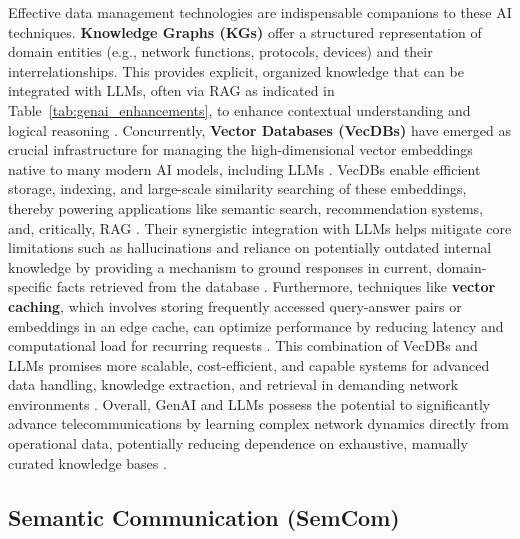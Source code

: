 \documentclass[sigconf]{acmart}
\begin{document}
Effective data management technologies are indispensable companions to these AI techniques. \textbf{Knowledge Graphs (KGs)} offer a structured representation of domain entities (e.g., network functions, protocols, devices) and their interrelationships. This provides explicit, organized knowledge that can be integrated with LLMs, often via RAG as indicated in Table~\ref{tab:genai_enhancements}, to enhance contextual understanding and logical reasoning \cite{ref4}. Concurrently, \textbf{Vector Databases (VecDBs)} have emerged as crucial infrastructure for managing the high-dimensional vector embeddings native to many modern AI models, including LLMs \cite{ref8}. VecDBs enable efficient storage, indexing, and large-scale similarity searching of these embeddings, thereby powering applications like semantic search, recommendation systems, and, critically, RAG \cite{ref8}. Their synergistic integration with LLMs helps mitigate core limitations such as hallucinations and reliance on potentially outdated internal knowledge by providing a mechanism to ground responses in current, domain-specific facts retrieved from the database \cite{ref8}. Furthermore, techniques like \textbf{vector caching}, which involves storing frequently accessed query-answer pairs or embeddings in an edge cache, can optimize performance by reducing latency and computational load for recurring requests \cite{ref14}. This combination of VecDBs and LLMs promises more scalable, cost-efficient, and capable systems for advanced data handling, knowledge extraction, and retrieval in demanding network environments \cite{ref8}. Overall, GenAI and LLMs possess the potential to significantly advance telecommunications by learning complex network dynamics directly from operational data, potentially reducing dependence on exhaustive, manually curated knowledge bases \cite{ref6, ref9}.

\subsection{Semantic Communication (SemCom)}
\end{document}
